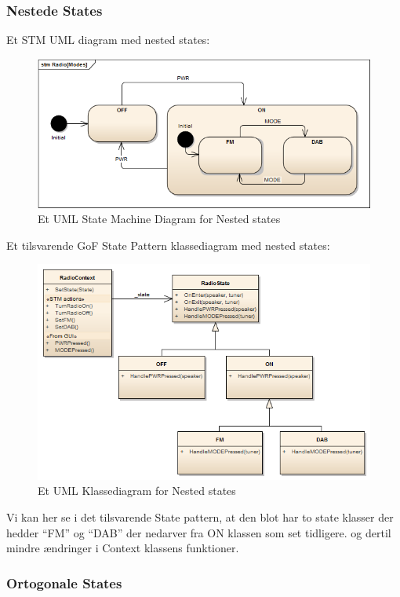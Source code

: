 \subsubsection{Nestede States}

Et STM UML diagram med nested states:

\begin{figure}[H]
	\centering
	\includegraphics[width=0.7\linewidth]{figs/state/Radio[Modes]_STM}
	\caption{Et UML State Machine Diagram for Nested states}
	\label{fig:UMLNestedState}
\end{figure}

Et tilsvarende GoF State Pattern klassediagram med nested states:

\begin{figure}[H]
	\centering
	\includegraphics[width=0.7\linewidth]{figs/state/RadioNeted_SP}
	\caption{Et UML Klassediagram for Nested states}
	\label{fig:UMLClassNestedState}
\end{figure}

Vi kan her se i det tilsvarende State pattern, at den blot har to state klasser der hedder “FM” og “DAB” der nedarver fra ON klassen som set tidligere. og dertil mindre ændringer i Context klassens funktioner. 

\subsubsection{Ortogonale States}

